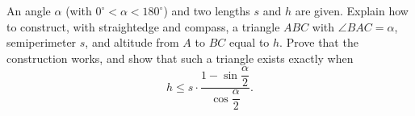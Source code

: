 An angle $\alpha$ (with $0^\circ<\alpha<180^\circ$) and two lengths $s$ and $h$ are given. Explain how to construct, with straightedge and compass, a triangle $ABC$ with $\angle BAC=\alpha$, semiperimeter $s$, and altitude from $A$ to $BC$ equal to $h$. Prove that the construction works, and show that such a triangle exists exactly when
\[h\le s\cdot\dfrac{1-\sin\dfrac{\alpha}{2}}{\cos\dfrac{\alpha}{2}}.\]
